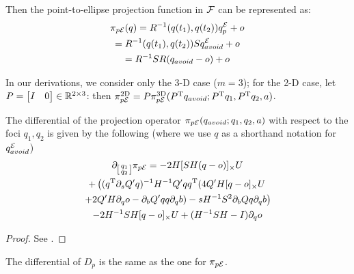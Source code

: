 \documentclass[journal]{IEEEtran}  %
\begin{document}

  Then the point-to-ellipse projection function in $\mathcal{F}$ can be represented as:
  \begin{multline}\label{equ:Point2EllipseProjection}
    \pi_{p\mathcal{E}}(q)= R^{-1}(q(t_1),q(t_2))q^{\mathcal{E}}_p+o \\
    = R^{-1}(q(t_1),q(t_2))Sq^{\mathcal{E}}_{avoid}+o\\
    = R^{-1}S R ( q_{avoid}- o)+o
  \end{multline}
  
  In our derivations, we consider only the 3-D case ($m=3$); for the 2-D case, let $P=\begin{bmatrix}I & 0\end{bmatrix}\in\mathbb{R}^{2\times 3}{}$: then $\pi_{p\mathcal{E}}^{\textrm{2D}}=P\pi_{p\mathcal{E}}^{\textrm{3D}}(P^\mathrm{T} q_{avoid}; P^\mathrm{T} q_1, P^\mathrm{T} q_2,a)$.

  \begin{proposition}\label{prop:Ellipse2PointDiff}
    The differential of the projection operator $\pi_{p\mathcal{E}}(q_{avoid}; q_1,q_2,a)$ with respect to the foci $q_1,q_2$ is given by the following (where we use $q$ as a shorthand notation for $q^{\mathcal{E}}_{avoid}$)
    \begin{multline}
      \partial_{\left[\begin{smallmatrix}q_1\\q_2\end{smallmatrix}\right]} \pi_{p\mathcal{E}}=-2 H [ SH(q-o)]_{\times}U   \\
      + \left( (q^\mathrm{T} \partial_sQ' q)^{-1} H^{-1} Q' q q^\mathrm{T}  (4Q' H[q - o]_\times U \right. \\
      \left.+ 2Q' H\partial_q o - \partial_b Q' q q \partial_q b) -  s H^{-1} S^2 \partial_b Q q \partial_q b\right) \\
      -2H^{-1} S H[q-o]_{\times} U  + (H^{-1}SH -I)\partial_q o
    \end{multline}
  \end{proposition}
  \begin{proof}
  See .
  \end{proof}
  The differential of $D_p$ is the same as the one for $\pi_{p\mathcal{E}}$.
\end{document}
